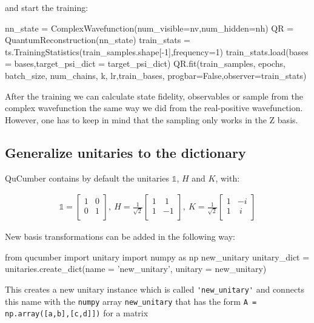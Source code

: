 \documentclass[submission, Phys]{SciPost}
\begin{document}
and start the training:

\begin{python}
	nn_state = ComplexWavefunction(num_visible=nv,num_hidden=nh)
	QR = QuantumReconstruction(nn_state)
	train_stats = ts.TrainingStatistics(train_samples.shape[-1],frequency=1)
	train_stats.load(bases = bases,target_psi_dict = target_psi_dict)
	QR.fit(train_samples, epochs, batch_size, num_chains, k,
	lr,train_bases, progbar=False,observer=train_stats)
\end{python}

After the training we can calculate state fidelity, observables or sample from the complex wavefunction
the same way we did from the real-positive wavefunction. However, one has to keep in mind that the sampling only works in the Z basis.

\subsection{Generalize unitaries to the dictionary}

QuCumber contains by default the unitaries $\mathds{1}$, $H$ and $K$, with:

\begin{align}
	\mathds{1} =
	\begin{bmatrix}
		1 & 0 \\
		0 & 1 \\
	\end{bmatrix},~
	H = \frac{1}{\sqrt{2}}
	\begin{bmatrix}
		1 & ~1 \\
		1 & -1 \\
	\end{bmatrix},~
	K = \frac{1}{\sqrt{2}}
	\begin{bmatrix}
		1 & -i \\
		1 & ~i \\
	\end{bmatrix}
\end{align}

New basis transformations can be added in the following way:

\begin{python}
	from qucumber import unitary
	import numpy as np
	new_unitary
	unitary_dict = unitaries.create_dict(name = 'new_unitary', unitary = new_unitary)
\end{python}

This creates a new unitary instance which is called \verb|'new_unitary'| and connects this name with the \verb|numpy| array
\verb|new_unitary| that has the form \verb|A = np.array([a,b],[c,d]])| for a matrix
\end{document}
